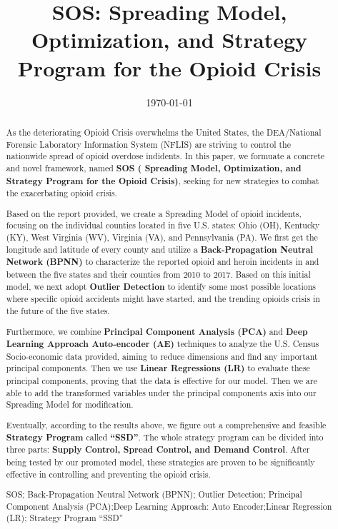 \documentclass{mcmthesis}
\author{}
\begin{document}
\linespread{0.6}  %
\setlength{\parskip}{0.5\baselineskip}  %
\title{SOS: Spreading Model, Optimization, and Strategy Program for the Opioid Crisis}

\date{\today}
\begin{abstract}
	As the deteriorating Opioid Crisis overwhelms the United States, the DEA/National Forensic Laboratory Information System (NFLIS) are striving to control the nationwide spread of opioid overdose indidents. In this paper, we formuate a concrete and novel framework, named \textbf{SOS ( Spreading Model, Optimization, and Strategy Program for the Opioid Crisis)}, seeking for new strategies to combat the exacerbating opioid crisis.
	
	Based on the report provided, we create a Spreading Model of opioid incidents, focusing on the individual counties located in five U.S. states: Ohio (OH), Kentucky (KY), West Virginia (WV), Virginia (VA), and Pennsylvania (PA). We first get the longitude and latitude of every county and utilize a \textbf{Back-Propagation Neutral Network (BPNN)} to characterize the reported opioid and heroin incidents in and between the five states and their counties from 2010 to 2017. Based on this initial model, we next adopt \textbf{Outlier Detection} to identify some most possible locations where specific opioid accidents might have started, and the trending opioids crisis in the future of the five states. 
	
	Furthermore, we combine \textbf{Principal Component Analysis (PCA)} and \textbf{Deep Learning Approach Auto-encoder (AE)} techniques to analyze the U.S. Census Socio-economic data provided, aiming to reduce dimensions and find any important principal components. Then we use \textbf{Linear Regressions (LR)} to evaluate these principal components, proving that the data is effective for our model. Then we are able to add the transformed variables under the principal components axis into our Spreading Model for modification.
	
	Eventually, according to the results above, we figure out a comprehensive and feasible \textbf{Strategy Program} called \textbf{``SSD''}. The whole strategy program can be divided into three parts: \textbf{Supply Control, Spread Control, and Demand Control}. After being tested by our promoted model, these strategies are proven to be significantly effective in controlling and preventing the opioid crisis.
	
	\begin{keywords}
		SOS; Back-Propagation Neutral Network (BPNN); Outlier Detection; Principal Component Analysis (PCA);Deep Learning Approach: Auto Encoder;Linear Regression (LR); Strategy Program ``SSD''
	\end{keywords}
\end{abstract}
\end{document}
